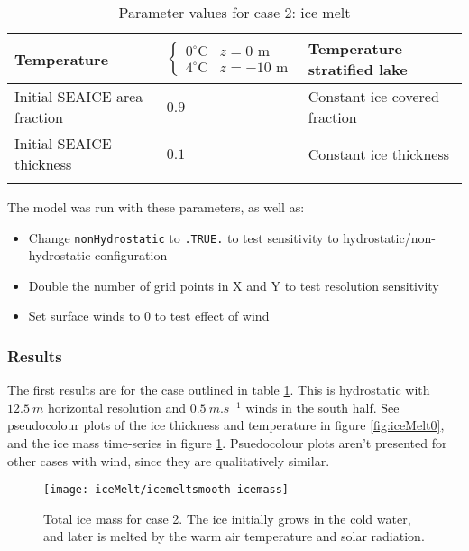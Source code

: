 \documentclass[11pt]{article}
\begin{document}
\begin{longtable}{  p{}  p{}  p{}  }
Temperature & \begin{equation*} \begin{cases} 0^{\circ} \text{C} & z = 0 \text{ m} \\ 4 ^{\circ} \text{C} & z = -10 \text{ m}   \end{cases} \end{equation*} & Temperature stratified lake \\ \hline
Initial SEAICE area fraction   & $0.9$ & Constant ice covered fraction \\ \hline
Initial SEAICE thickness    & $0.1$ & Constant ice thickness \\ \hline

\caption{Parameter values for case 2: ice melt}
\label{table:iceMelt}
\end{longtable}
The model was run with these parameters, as well as:
\begin{itemize}
\item{Change \verb|nonHydrostatic| to \verb|.TRUE.| to test sensitivity to hydrostatic/non-hydrostatic configuration}
\item{Double the number of grid points in X and Y to test resolution sensitivity}
\item{Set surface winds to 0 to test effect of wind}
\end{itemize}

\subsubsection{Results}
The first results are for the case outlined in table \ref{table:iceMelt}. This is hydrostatic with $\SI{12.5}{m}$ horizontal resolution and $\SI{0.5}{m.s^{-1}}$ winds in the south half. See pseudocolour plots of the ice thickness and temperature in figure \ref{fig:iceMelt0}, and the ice mass time-series in figure \ref{fig:iceMelt0IceMass}. Psuedocolour plots aren't presented for other cases with wind, since they are qualitatively similar.

\begin{figure}[h!]
\centering
\texttt{[image: iceMelt/icemeltsmooth-icemass]}
\caption{Total ice mass for case 2. The ice initially grows in the cold water, and later is melted by the warm air temperature and solar radiation.}
\label{fig:iceMelt0IceMass}
\end{figure}
\end{document}
